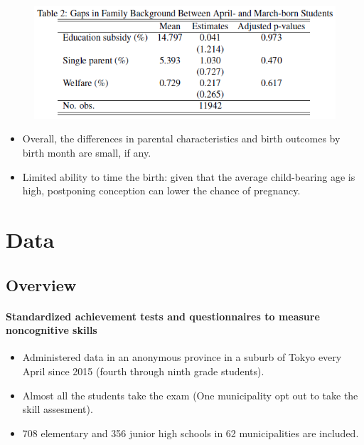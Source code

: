 \documentclass[../root]{subfiles}
\begin{document}
    \begin{figure}[ht]
      \centering
      \includegraphics[scale = 1]{0904tanji/T2}
    \end{figure}

    \begin{itemize}
      \item Overall, the differences in parental characteristics and birth outcomes by birth month are small, if any.
      \item Limited ability to time the birth: given that the average child-bearing age is high, postponing conception can lower the chance of pregnancy.
    \end{itemize}
    \section{Data}


    \subsection{Overview}

    \paragraph{Standardized achievement tests and questionnaires to measure noncognitive skills}

    \begin{itemize}
      \item Administered data in an anonymous province in a suburb of Tokyo every April since 2015 (fourth through ninth grade students).
      \item Almost all the students take the exam (One municipality opt out to take the skill assesment).
      \item 708 elementary and 356 junior high schools in 62 municipalities are included.
    \end{itemize}
\end{document}
